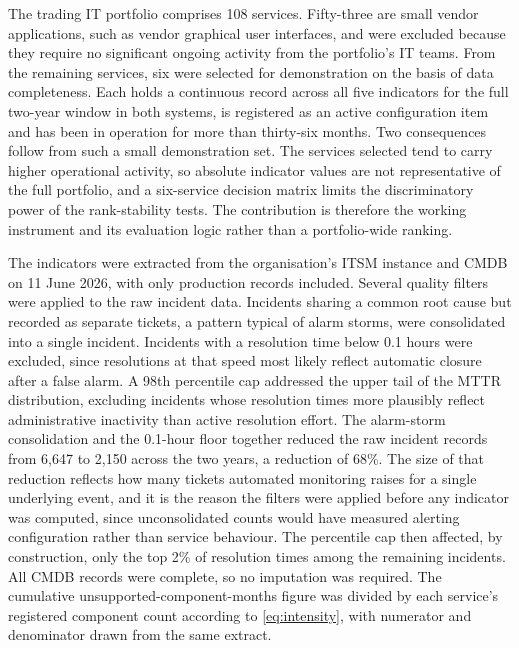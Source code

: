 \documentclass[
  authoryear,
  preprint]{elsarticle}
\begin{document}
The trading IT portfolio comprises 108 services. Fifty-three are small
vendor applications, such as vendor graphical user interfaces, and were
excluded because they require no significant ongoing activity from the
portfolio's IT teams. From the remaining services, six were selected for
demonstration on the basis of data completeness. Each holds a continuous
record across all five indicators for the full two-year window in both
systems, is registered as an active configuration item and has been in
operation for more than thirty-six months. Two consequences follow from
such a small demonstration set. The services selected tend to carry
higher operational activity, so absolute indicator values are not
representative of the full portfolio, and a six-service decision matrix
limits the discriminatory power of the rank-stability tests. The
contribution is therefore the working instrument and its evaluation
logic rather than a portfolio-wide ranking.

The indicators were extracted from the organisation's ITSM instance and
CMDB on 11 June 2026, with only production records included. Several
quality filters were applied to the raw incident data. Incidents sharing
a common root cause but recorded as separate tickets, a pattern typical
of alarm storms, were consolidated into a single incident. Incidents
with a resolution time below 0.1 hours were excluded, since resolutions
at that speed most likely reflect automatic closure after a false alarm.
A 98th percentile cap addressed the upper tail of the MTTR distribution,
excluding incidents whose resolution times more plausibly reflect
administrative inactivity than active resolution effort. The alarm-storm
consolidation and the 0.1-hour floor together reduced the raw incident
records from 6,647 to 2,150 across the two years, a reduction of 68\%.
The size of that reduction reflects how many tickets automated
monitoring raises for a single underlying event, and it is the reason
the filters were applied before any indicator was computed, since
unconsolidated counts would have measured alerting configuration rather
than service behaviour. The percentile cap then affected, by
construction, only the top 2\% of resolution times among the remaining
incidents. All CMDB records were complete, so no imputation was
required. The cumulative unsupported-component-months figure was divided
by each service's registered component count according to
\eqref{eq:intensity}, with numerator and denominator drawn from the same
extract.
\end{document}
